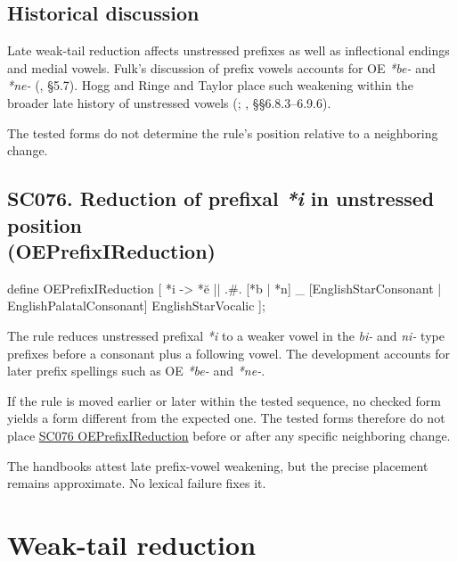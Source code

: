\documentclass[
  british,
  a4paper,
  openany]{book}
\providecommand{\texorpdfstring}[2]{#1}
\DeclareRobustCommand{\CAPRRuleHeading}[2]{%
  #1\texorpdfstring{\\(#2)}{ (#2)}%
}
\begin{document}
\subsection{Historical discussion}\label{historical-discussion-36}

Late weak-tail reduction affects unstressed prefixes as well as
inflectional endings and medial vowels. Fulk's discussion of prefix
vowels accounts for OE \emph{*be-} and \emph{*ne-}
(, §5.7). Hogg and Ringe and
Taylor place such weakening within the broader late history of
unstressed vowels (;
,
§§6.8.3--6.9.6).

The tested forms do not determine the rule's position relative to a
neighboring change.

\subsection{\texorpdfstring{\CAPRRuleHeading{SC076. Reduction of prefixal \emph{*i} in unstressed position}{OEPrefixIReduction}}{}}\label{rule-OEPrefixIReduction}

\begin{ReaderFacingFoma}
define OEPrefixIReduction [
    {*i} -> {*ĕ} || .#. [{*b} | {*n}] _ [EnglishStarConsonant | EnglishPalatalConsonant] EnglishStarVocalic
];
\end{ReaderFacingFoma}

The rule reduces unstressed prefixal \emph{*i} to a weaker vowel in the
\emph{bi-} and \emph{ni-} type prefixes before a consonant plus a
following vowel. The development accounts for later prefix spellings
such as OE \emph{*be-} and \emph{*ne-}.

If the rule is moved earlier or later within the tested sequence, no
checked form yields a form different from the expected one. The tested
forms therefore do not place \hyperref[rule-OEPrefixIReduction]{SC076
OEPrefixIReduction} before or after any specific neighboring change.

The handbooks attest late prefix-vowel weakening, but the precise
placement remains approximate. No lexical failure fixes it.

\newpage

\section{Weak-tail reduction}\label{weak-tail-reduction}
\end{document}
